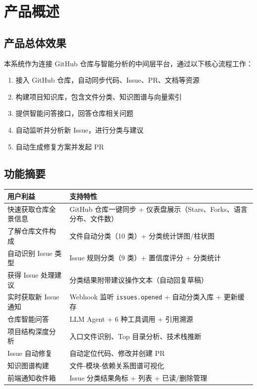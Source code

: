 \documentclass[10pt,a4paper]{article}
\newenvironment{ieeetable}{\begin{center}}{\end{center}}
\begin{document}
\section{产品概述}

\subsection{产品总体效果}

本系统作为连接 GitHub 仓库与智能分析的中间层平台，通过以下核心流程工作：

\begin{enumerate}
    \item 接入 GitHub 仓库，自动同步代码、Issue、PR、文档等资源
    \item 构建项目知识库，包含文件分类、知识图谱与向量索引
    \item 提供智能问答接口，回答仓库相关问题
    \item 自动监听并分析新 Issue，进行分类与建议
    \item 自动生成修复方案并发起 PR
\end{enumerate}

\subsection{功能摘要}

\begin{ieeetable}
    \begin{tabularx}{\textwidth}{L{4cm} X}
        \toprule
        \textbf{用户利益} & \textbf{支持特性} \\
        \midrule
        快速获取仓库全景信息 & GitHub 仓库一键同步 + 仪表盘展示（Stars、Forks、语言分布、文件数） \\
        \midrule
        了解仓库文件构成 & 文件自动分类（10 类）+ 分类统计饼图/柱状图 \\
        \midrule
        自动识别 Issue 类型 & Issue 规则分类（9 类）+ 置信度评分 + 分类统计 \\
        \midrule
        获得 Issue 处理建议 & 分类结果附带建议操作文本（自动回复草稿） \\
        \midrule
        实时获取新 Issue 通知 & Webhook 监听 \texttt{issues.opened} + 自动分类入库 + 更新缓存 \\
        \midrule
        仓库智能问答 & LLM Agent + 6 种工具调用 + 引用溯源 \\
        \midrule
        项目结构深度分析 & 入口文件识别、Top 目录分析、技术栈推断 \\
        \midrule
        Issue 自动修复 & 自动定位代码、修改并创建 PR \\
        \midrule
        知识图谱构建 & 文件-模块-依赖关系图谱可视化 \\
        \midrule
        前端通知收件箱 & Issue 分类结果角标 + 列表 + 已读/删除管理 \\
        \bottomrule
    \end{tabularx}
\end{ieeetable}
\end{document}
